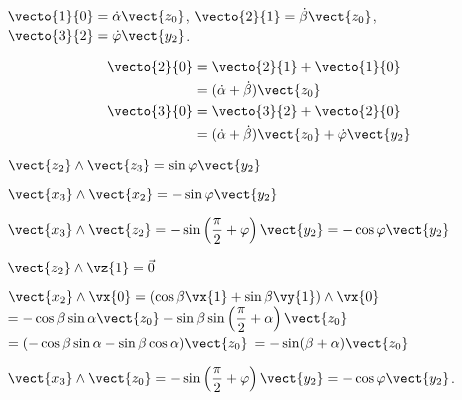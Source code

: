 \ifprof

\begin{corrige}

\end{corrige}\else\fi

\ifprof
\begin{corrige}
$\vecto{1}{0} = \dot\alpha\vect{z_0}$, 
$\vecto{2}{1} = \dot\beta\vect{z_0}$,
$\vecto{3}{2} = \dot\varphi\vect{y_2}$.

\end{corrige}\else\fi



\ifprof
\begin{corrige}
\begin{align*}
\vecto{2}{0}&=\vecto{2}{1}+\vecto{1}{0}\\
	&=(\dot\alpha+\dot\beta)\vect{z_0}\\
\vecto{3}{0}&=\vecto{3}{2}+\vecto{2}{0}\\
	&=(\dot\alpha+\dot\beta)\vect{z_0}+\dot\varphi\vect{y_2}
\end{align*}

\end{corrige}\else\fi

\ifprof
\begin{corrige}
$ \vect{z_2} \wedge \vect{z_3} =\sin\varphi \vect{y_2}$


$\vect{x_3} \wedge\vect{x_2} = -\sin\varphi \vect{y_2}$

$\vect{x_3} \wedge \vect{z_2}= -\sin\left(\dfrac{\pi}{2}+\varphi\right)\vect{y_2} =-\cos\varphi\vect{y_2}$

$\vect{z_2} \wedge \vz{1}  = \vec{0}$

$\vect{x_2} \wedge \vx{0} = \left(\cos\beta\vx{1}+\sin\beta\vy{1}\right)\wedge\vx{0}$
$=-\cos\beta\sin\alpha\vect{z_0} - \sin\beta\sin\left(\dfrac{\pi}{2}+\alpha\right)\vect{z_0}$
$=(-\cos\beta\sin\alpha-\sin\beta\cos\alpha)\vect{z_0}$
$=-\sin(\beta+\alpha)\vect{z_0}$

$\vect{x_3}\wedge\vect{z_0} = -\sin\left(\dfrac{\pi}{2}+\varphi\right)\vect{y_2} =-\cos\varphi\vect{y_2}$.

\end{corrige}\else\fi

